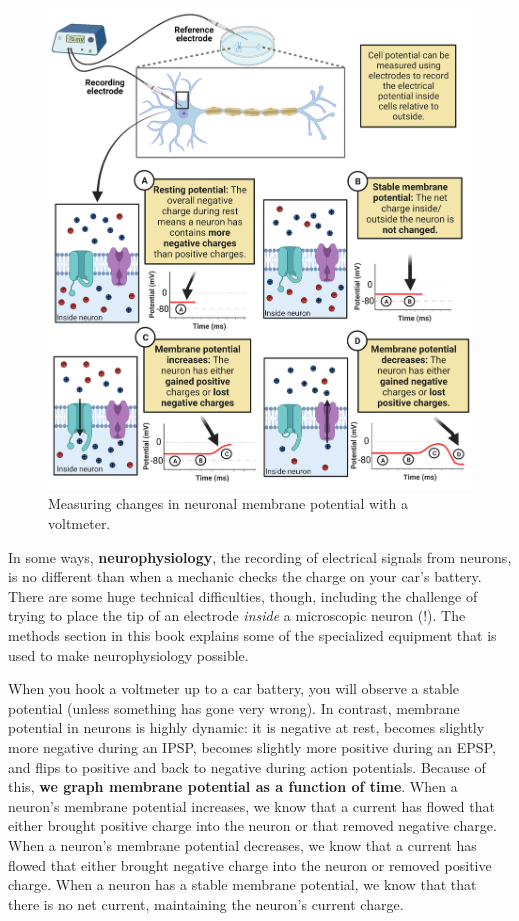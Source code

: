 \documentclass[
]{book}
\begin{document}
\begin{figure}

{\centering \includegraphics[width=0.9\linewidth]{images/ch02/02_13} 

}

\caption{Measuring changes in neuronal membrane potential with a voltmeter.}\label{fig:ch02-neurophysiology}
\end{figure}

In some ways, \textbf{neurophysiology}, the recording of electrical signals from neurons, is no different than when a mechanic checks the charge on your car's battery. There are some huge technical difficulties, though, including the challenge of trying to place the tip of an electrode \emph{inside} a microscopic neuron (!). The methods section in this book explains some of the specialized equipment that is used to make neurophysiology possible.

When you hook a voltmeter up to a car battery, you will observe a stable potential (unless something has gone very wrong). In contrast, membrane potential in neurons is highly dynamic: it is negative at rest, becomes slightly more negative during an IPSP, becomes slightly more positive during an EPSP, and flips to positive and back to negative during action potentials. Because of this, \textbf{we graph membrane potential as a function of time}. When a neuron's membrane potential increases, we know that a current has flowed that either brought positive charge into the neuron or that removed negative charge. When a neuron's membrane potential decreases, we know that a current has flowed that either brought negative charge into the neuron or removed positive charge. When a neuron has a stable membrane potential, we know that that there is no net current, maintaining the neuron's current charge.
\end{document}
